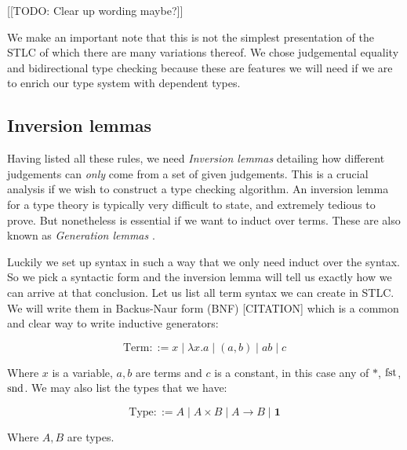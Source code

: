 [[TODO: Clear up wording maybe?]]
\begin{remark}
    We make an important note that this is not the simplest presentation of the STLC of which there are many variations thereof. We chose judgemental equality and bidirectional type checking because these are features we will need if we are to enrich our type system with dependent types.
\end{remark}

\subsection{Inversion lemmas}
Having listed all these rules, we need \emph{Inversion lemmas} detailing how different judgements can \emph{only} come from a set of given judgements. This is a crucial analysis if we wish to construct a type checking algorithm. An inversion lemma for a type theory is typically very difficult to state, and extremely tedious to prove. But nonetheless is essential if we want to induct over terms. These are also known as \emph{Generation lemmas} \cite{Sorensen, harper_2016}.

Luckily we set up syntax in such a way that we only need induct over the syntax. So we pick a syntactic form and the inversion lemma will tell us exactly how we can arrive at that conclusion. Let us list all term syntax we can create in STLC. We will write them in Backus-Naur form (BNF) [CITATION] which is a common and clear way to write inductive generators:

$$
    \mathrm{Term} ::= x \mid \lambda x . a \mid (a, b) \mid a b \mid c
$$

Where $x$ is a variable, $a, b$ are terms and $c$ is a constant, in this case any of $*$, $\mathrm{fst}$, $\mathrm{snd}$. We may also list the types that we have:

$$
    \mathrm{Type} ::= A \mid A \times B \mid A \to B \mid \mathbf{1}
$$

Where $A, B$ are types.


